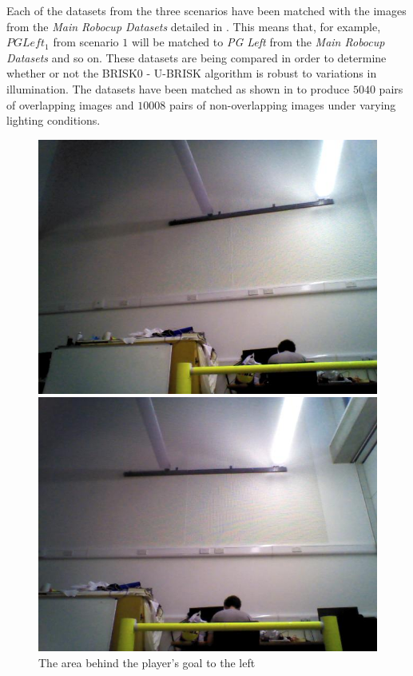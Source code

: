 \documentclass[11pt]{report}
\begin{document}
Each of the datasets from the three scenarios have been matched with the images from the \textit{Main Robocup Datasets} detailed in . This means that, for example, \textit{$PG Left_1$} from scenario $1$ will be matched to \textit{PG Left} from the \textit{Main Robocup Datasets} and so on. These datasets are being compared in order to determine whether or not the BRISK0 - U-BRISK algorithm is robust to variations in illumination. The datasets have been matched as shown in  to produce $5040$ pairs of overlapping images and $10008$ pairs of non-overlapping images under varying lighting conditions.\\

\begin{figure}
\begin{minipage}[b]{0.5\linewidth}
\includegraphics[scale=0.3]{../Drawings/lighting/leftLight/1.jpg}
\caption{The area behind the player's goal to the left}
\label{fig:leftmgleft}
\end{minipage}
\hspace{0.5cm}
\begin{minipage}[b]{0.5\linewidth}
\includegraphics[scale=0.3]{../Drawings/lighting/leftLight/2.jpg}

\end{minipage}
\end{figure}
\end{document}

